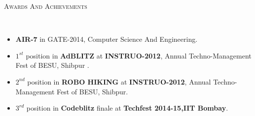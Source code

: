\documentclass[a4paper,10pt]{article}
\newenvironment{changemargin}[2]{%
	\begin{list}{}{%
			\setlength{\topsep}{0pt}%
			\setlength{\leftmargin}{#1}%
			\setlength{\rightmargin}{#2}%
			\setlength{\listparindent}{\parindent}%
			\setlength{\parsep}{\parskip}%
		}%
		\item[]}{\end{list}
}
\newcommand{\lineover}{
	\begin{changemargin}{-0.0in}{-0.0in}
		\vspace*{-8pt}
		\hrulefill \\
		\vspace*{-2pt}
	\end{changemargin}
}
\newcommand{\header}[1]{
	\begin{changemargin}{-0.0in}{-0.0in}
		\large	\scshape {#1}\\	
		\lineover
	\end{changemargin}
}
\newenvironment{body} {
	\vspace*{-16pt}
	\begin{changemargin}{-0.0in}{-0.in}
	}	
	{\end{changemargin}
}
\begin{document}
	\vspace{-1ex}
	\header{Awards And Achievements}
	\vspace{-0.5ex}
	\begin{body}
		\vspace{14pt}
		\begin{itemize}
			\setlength{\itemindent}{0em}
			\setlength{\itemsep}{0em}
			\item \textbf{AIR-7} in GATE-2014, Computer Science And Engineering.
			\vspace{-0.5ex}
			\item \textbf{$1^{st}$} position in \textbf{AdBLITZ} at \textbf{INSTRUO-2012}, Annual Techno-Management Fest of BESU, Shibpur .
			\vspace{-0.5ex}
			\item \textbf{$2^{nd}$} position in \textbf{ROBO HIKING} at \textbf{INSTRUO-2012}, Annual Techno-Management Fest of BESU, Shibpur.	
			\vspace{-0.5ex}
			\item \textbf{$3^{rd}$} position in \textbf{Codeblitz} finale at \textbf{Techfest 2014-15,IIT Bombay}.
		\end{itemize}
		
	\end{body}
	
\end{document}
